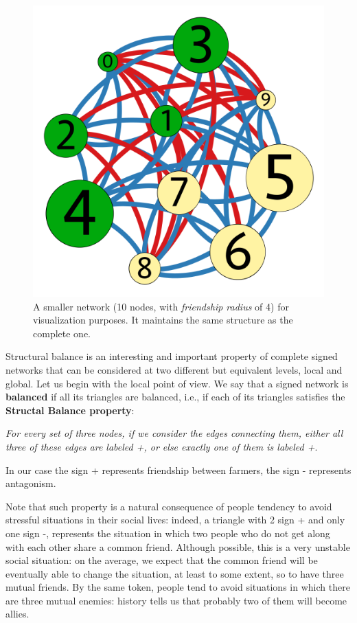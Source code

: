 \documentclass{report}
\theoremstyle{definition}
\theoremstyle{remark}
\begin{document}
\begin{figure} [h]
	\centering
	\includegraphics [scale = 0.2]{farmers_reduced.png}
	\caption{A smaller network (10 nodes, with \textit{friendship radius} of 4) for visualization purposes. It maintains the same structure as the complete one.}  \label{fig:10farmers}
\end{figure}

\newpage
Structural balance is an interesting and important property of complete signed networks that can be considered at two different but equivalent levels, local and global. Let us begin with the local point of view. We say that a signed network is \textbf{balanced} if all its triangles are balanced, i.e., if each of its triangles satisfies the \textbf{Structal Balance property}:
\bigskip

\textit{For every set of three nodes, if we consider the edges connecting them, either all three of these edges are labeled +, or else exactly one of them is labeled +}.
\bigskip


In our case the sign + represents friendship between farmers, the sign - represents antagonism.

Note that such property is a natural consequence of people tendency to avoid stressful situations in their social lives: indeed, a triangle with 2 sign + and only one sign -, represents the situation in which two people who do not get along with each other share a common friend. Although possible, this is a very unstable social situation: on the average, we expect that the common friend will be eventually able to change the situation, at least to some extent, so to have three mutual friends. By the same token, people tend to avoid situations in which there are three mutual enemies: history tells us that probably two of them will become allies.
\end{document}
